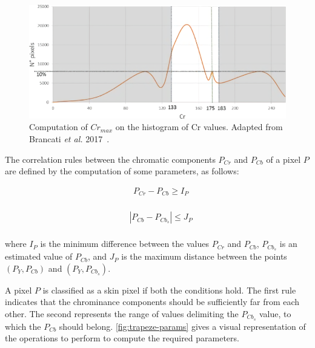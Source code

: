 \begin{figure}[!htb]
	\centering
	\includegraphics[width=0.9\linewidth]{images/approaches/thresholding/dyc_percentile.png}
	\caption{Computation of $Cr_{max}$ on the histogram of Cr values. Adapted from Brancati \textit{et al.} 2017~\cite{brancati2017human}.}
	\label{fig:dyc-percentile}
\end{figure}

The correlation rules between the chromatic components $P_{Cr}$ and $P_{Cb}$ of a pixel $P$ are defined by the computation of some parameters, as follows:

\begin{equation}
\begin{aligned}
&P_{C r}-P_{C b} \geq I_{P} \\
\end{aligned}
\end{equation}

\begin{equation}
\begin{aligned}
&\left|P_{C b}-P_{C b_{s}}\right| \leq J_{P}\\
\end{aligned}
\end{equation}

where $I_P$ is the minimum difference between the values $P_{Cr}$ and $P_{Cb}$, $P_{C b_{s}}$ is an estimated value of $P_{Cb}$, and $J_P$ is the maximum distance between the points $(P_Y, P_{Cb})$ and $(P_Y, P_{C b_{s}})$.

\noindent A pixel $P$ is classified as a skin pixel if both the conditions hold. The first rule indicates that the chrominance components should be sufficiently far from each other.
The second represents the range of values delimiting the $P_{C b_{s}}$ value, to which the $P_{Cb}$ should belong. \autoref{fig:trapeze-params} gives a visual representation of the operations to perform to compute the required parameters.

